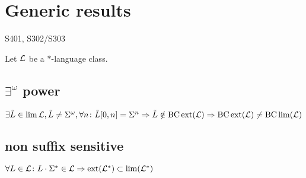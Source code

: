 \section{Generic results}

S401, S302/S303

Let $\mathcal{L}$ be a $*$-language class.

\subsection{$\exists^\omega$ power}

$\exists \tilde{L} \in \lim \mathcal{L}, \tilde{L} \neq \Sigma^\omega, \forall n \colon \tilde{L}[0,n] = \Sigma^n
\Rightarrow \tilde{L} \notin \operatorname{BC} \operatorname{ext} (\mathcal{L})
\Rightarrow \operatorname{BC} \operatorname{ext} (\mathcal{L}) \neq \operatorname{BC} \lim (\mathcal{L})$

\subsection{non suffix sensitive}

$\forall L \in \mathcal{L} \colon L \cdot \Sigma^* \in \mathcal{L}
\Rightarrow \operatorname{ext}(\mathcal{L}^*) \subset \lim(\mathcal{L}^*)$
